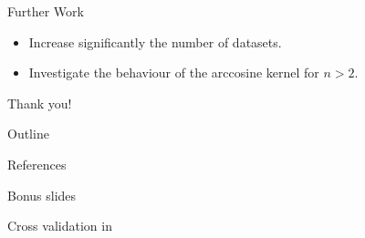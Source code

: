 \documentclass[aspectratio=169]{beamer}
\begin{document}
\begin{frame}{Further Work}
	\begin{itemize}
		\item Increase significantly the number of datasets.
		\item Investigate the behaviour of the arccosine kernel for $n>2$.
	\end{itemize}
\end{frame}

\begin{frame}[standout]
	Thank you!
\end{frame}

\begin{frame}{Outline}
	\vspace{1em}
	\setcounter{tocdepth}{1}
	\tableofcontents
\end{frame}
\appendix

\begin{frame}[allowframebreaks]{References}
	\printbibliography[heading=none]
\end{frame}

\begin{frame}[standout]
	Bonus slides
\end{frame}

\begin{frame}{Cross validation in \textcite{frenayParameterinsensitiveKernelExtreme2011}}
	\begin{figure}[H]
		\resizebox{0.95\textwidth}{0.9\textheight}{
			
		}
	\end{figure}
\end{frame}
\end{document}
